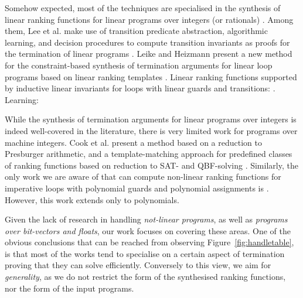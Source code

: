 \documentclass[preprint]{sigplanconf}
\theoremstyle{definition}
\begin{document}
Somehow expected, most of the techniques are specialised in the synthesis of linear ranking functions for linear programs over integers (or rationals) \cite{DBLP:conf/pldi/CookPR06,DBLP:conf/cav/LeeWY12,DBLP:conf/popl/Ben-AmramG13,DBLP:conf/vmcai/P04,DBLP:conf/atva/HeizmannHLP13,DBLP:conf/cav/BradleyMS05,DBLP:conf/tacas/CookSZ13}. 
Among them, 
Lee et al. make use of transition predicate abstraction, algorithmic learning, and decision procedures to compute transition
invariants as proofs for the termination of linear programs \cite{DBLP:conf/cav/LeeWY12}.
Leike and Heizmann present a new method for the constraint-based synthesis
of termination arguments for linear loop programs based on
linear ranking templates \cite{DBLP:conf/tacas/LeikeH14}.
Linear ranking functions supported by inductive linear invariants for loops with linear guards and transitions: \cite{DBLP:conf/cav/BradleyMS05}. 
Learning: \cite{DBLP:journals/corr/HeizmannHP14}



While the synthesis of termination arguments for linear programs over integers is indeed well-covered in the literature, 
there is very limited work for programs over machine integers.
Cook et al. present a method based on a reduction to Presburger
arithmetic, and a template-matching approach for predefined classes of
ranking functions based on reduction to SAT- and QBF-solving \cite{DBLP:conf/tacas/CookKRW10}.
Similarly, the only work we are aware of that can compute non-linear ranking functions  
for imperative loops with polynomial guards and polynomial assignments
is \cite{DBLP:conf/vmcai/BradleyMS05}. However, this work extends only to polynomials.

Given the lack of research in handling \emph{not-linear programs}, as well as \emph{programs over bit-vectors and floats},  
our work focuses on covering these areas. 
One of the obvious conclusions that can be reached from observing Figure~\ref{fig:handletable}, 
is that most of the works tend to specialise on a certain aspect of termination proving that they can solve efficiently. 
Conversely to this view, we aim for \emph{generality}, as we do not restrict the form of the synthesised ranking functions, nor the form of the input programs.
\end{document}
